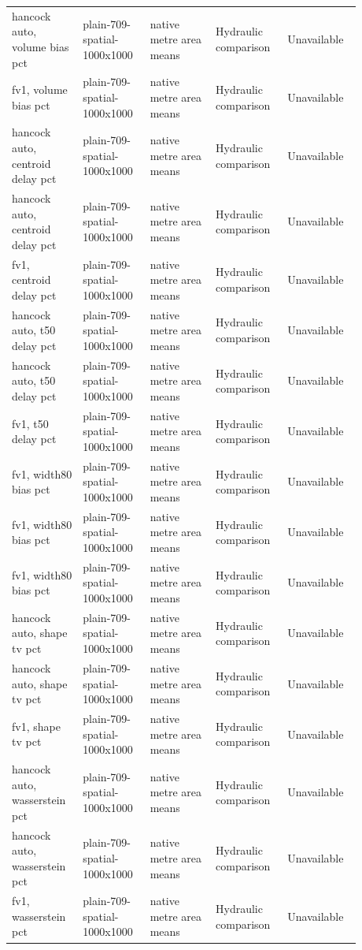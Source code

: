 \begin{longtable}{p{0.1760\linewidth}p{0.1760\linewidth}p{0.1760\linewidth}p{0.1760\linewidth}p{0.1760\linewidth}}
hancock auto, volume bias pct & plain-709-spatial-1000x1000 & native metre area means & Hydraulic comparison & Unavailable \\
fv1, volume bias pct & plain-709-spatial-1000x1000 & native metre area means & Hydraulic comparison & Unavailable \\
hancock auto, centroid delay pct & plain-709-spatial-1000x1000 & native metre area means & Hydraulic comparison & Unavailable \\
hancock auto, centroid delay pct & plain-709-spatial-1000x1000 & native metre area means & Hydraulic comparison & Unavailable \\
fv1, centroid delay pct & plain-709-spatial-1000x1000 & native metre area means & Hydraulic comparison & Unavailable \\
hancock auto, t50 delay pct & plain-709-spatial-1000x1000 & native metre area means & Hydraulic comparison & Unavailable \\
hancock auto, t50 delay pct & plain-709-spatial-1000x1000 & native metre area means & Hydraulic comparison & Unavailable \\
fv1, t50 delay pct & plain-709-spatial-1000x1000 & native metre area means & Hydraulic comparison & Unavailable \\
fv1, width80 bias pct & plain-709-spatial-1000x1000 & native metre area means & Hydraulic comparison & Unavailable \\
fv1, width80 bias pct & plain-709-spatial-1000x1000 & native metre area means & Hydraulic comparison & Unavailable \\
fv1, width80 bias pct & plain-709-spatial-1000x1000 & native metre area means & Hydraulic comparison & Unavailable \\
hancock auto, shape tv pct & plain-709-spatial-1000x1000 & native metre area means & Hydraulic comparison & Unavailable \\
hancock auto, shape tv pct & plain-709-spatial-1000x1000 & native metre area means & Hydraulic comparison & Unavailable \\
fv1, shape tv pct & plain-709-spatial-1000x1000 & native metre area means & Hydraulic comparison & Unavailable \\
hancock auto, wasserstein pct & plain-709-spatial-1000x1000 & native metre area means & Hydraulic comparison & Unavailable \\
hancock auto, wasserstein pct & plain-709-spatial-1000x1000 & native metre area means & Hydraulic comparison & Unavailable \\
fv1, wasserstein pct & plain-709-spatial-1000x1000 & native metre area means & Hydraulic comparison & Unavailable \\

\end{longtable}
